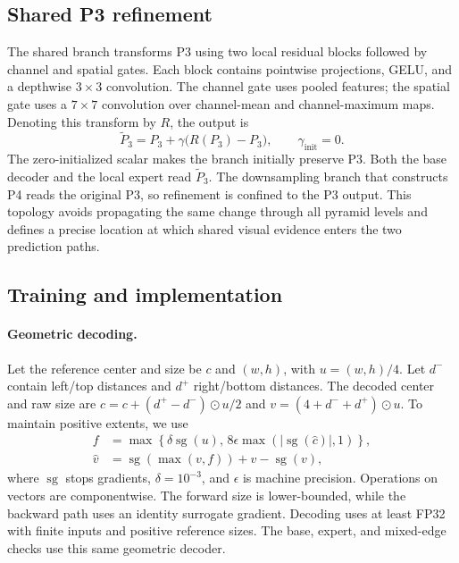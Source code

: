 \subsection{Shared P3 refinement}
The shared branch transforms P3 using two local residual blocks followed by channel and spatial gates. Each block contains pointwise projections, GELU, and a depthwise $3\times3$ convolution. The channel gate uses pooled features; the spatial gate uses a $7\times7$ convolution over channel-mean and channel-maximum maps. Denoting this transform by $R$, the output is
\begin{equation}
\widetilde P_3=P_3+\gamma\bigl(R(P_3)-P_3\bigr),\qquad
\gamma_{\mathrm{init}}=0.
\label{eq:shared}
\end{equation}
The zero-initialized scalar makes the branch initially preserve P3. Both the base decoder and the local expert read $\widetilde P_3$. The downsampling branch that constructs P4 reads the original P3, so refinement is confined to the P3 output. This topology avoids propagating the same change through all pyramid levels and defines a precise location at which shared visual evidence enters the two prediction paths.

\subsection{Training and implementation}
\label{sec:training}

\paragraph{Geometric decoding.}
Let the reference center and size be $c$ and $(w,h)$, with $u=(w,h)/4$. Let $d^{-}$ contain left/top distances and $d^{+}$ right/bottom distances. The decoded center and raw size are $\hat c=c+(d^{+}-d^{-})\odot u/2$ and $v=(4+d^{-}+d^{+})\odot u$. To maintain positive extents, we use
\begin{equation}
\begin{aligned}
f&=\max\!\left\{\delta\operatorname{sg}(u),\,
8\epsilon\max(|\operatorname{sg}(\hat c)|,1)\right\},\\
\hat v&=\operatorname{sg}(\max(v,f))+v-\operatorname{sg}(v),
\end{aligned}
\label{eq:geometry}
\end{equation}
where $\operatorname{sg}$ stops gradients, $\delta=10^{-3}$, and $\epsilon$ is machine precision. Operations on vectors are componentwise. The forward size is lower-bounded, while the backward path uses an identity surrogate gradient. Decoding uses at least FP32 with finite inputs and positive reference sizes. The base, expert, and mixed-edge checks use this same geometric decoder.

